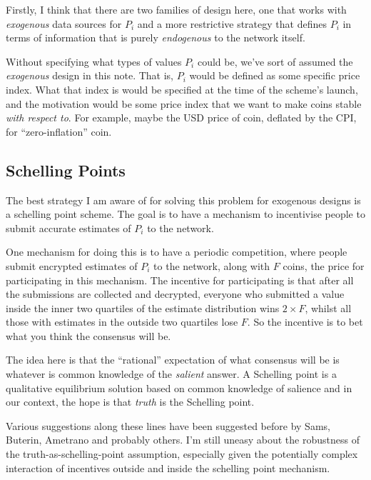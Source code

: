 \documentclass[twocolumn]{article}
\begin{document}
Firstly, I think that there are two families of design here, one that
works with \emph{exogenous} data sources for $P_{i}$ and a more
restrictive strategy that defines $P_{i}$ in terms of information that
is purely \emph{endogenous} to the network itself.

Without specifying what types of values $P_{i}$ could be, we've sort
of assumed the \emph{exogenous} design in this note. That is, $P_{i}$
would be defined as some specific price index. What that index is
would be specified at the time of the scheme's launch, and the
motivation would be some price index that we want to make coins stable
\emph{with respect to}. For example, maybe the USD price of coin,
deflated by the CPI, for ``zero-inflation'' coin. 

\subsection*{Schelling Points}
The best strategy I am aware of for solving this problem for exogenous
designs is a schelling point scheme. The goal is to have a mechanism
to incentivise people to submit accurate estimates of $P_{i}$ to the
network. 

One mechanism for doing this is to have a periodic competition, where
people submit encrypted estimates of $P_{i}$ to the network, along
with $F$ coins, the price for participating in this mechanism. The
incentive for participating is that after all the submissions are
collected and decrypted, everyone who submitted a value inside the
inner two quartiles of the estimate distribution wins $2\times F$,
whilst all those with estimates in the outside two quartiles lose
$F$. So the incentive is to bet what you think the consensus will be. 

The idea here is that the ``rational'' expectation of what consensus
will be is whatever is common knowledge of the \emph{salient}
answer. A Schelling point is a qualitative equilibrium solution based
on common knowledge of salience and in our context, the hope is that
\emph{truth} is the Schelling point.

Various suggestions along these lines have been suggested before by
Sams\cite{sams}, Buterin\cite{buterin}, Ametrano\cite{ametrano} and
probably others. I'm still uneasy about the robustness of the
truth-as-schelling-point assumption, especially given the potentially
complex interaction of incentives outside and inside the schelling
point mechanism.
\end{document}
